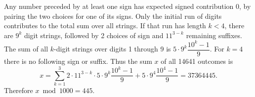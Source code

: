 Any number preceded by at least one sign has expected signed contribution 0, by pairing the two choices for one of its signs. Only the initial run of digits contributes to the total sum over all strings. If that run has length $k<4$, there are $9^k$ digit strings, followed by 2 choices of sign and $11^{3-k}$ remaining suffixes. The sum of all $k$-digit strings over digits 1 through 9 is $5\cdot9^k\dfrac{10^k-1}{9}$. For $k=4$ there is no following sign or suffix. Thus the sum $x$ of all 14641 outcomes is
\[x=\sum_{k=1}^3 2\cdot11^{3-k}\cdot5\cdot9^k\dfrac{10^k-1}{9}+5\cdot9^4\dfrac{10^4-1}{9}=37364445.\]
Therefore $\boxed{x\bmod1000=445}$.
